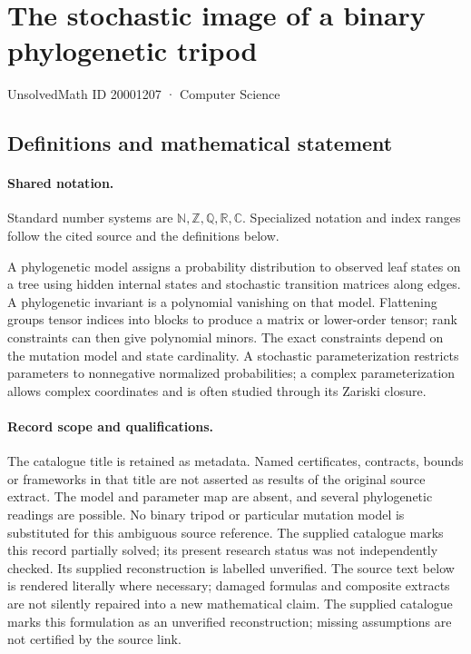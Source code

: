 \documentclass[11pt]{article}
\begin{document}
\setcounter{section}{20001206}
\section{The stochastic image of a binary phylogenetic tripod}\label{20001207}
{\small\sffamily UnsolvedMath ID 20001207 · Computer Science}
\subsection{Definitions and mathematical statement}

\paragraph{Shared notation.}Standard number systems are $\mathbb N,\mathbb Z,\mathbb Q,\mathbb R,\mathbb C$. Specialized notation and index ranges follow the cited source and the definitions below.


A phylogenetic model assigns a probability distribution to observed leaf states on a tree using hidden internal states and stochastic transition matrices along edges. A phylogenetic invariant is a polynomial vanishing on that model. Flattening groups tensor indices into blocks to produce a matrix or lower-order tensor; rank constraints can then give polynomial minors. The exact constraints depend on the mutation model and state cardinality. A stochastic parameterization restricts parameters to nonnegative normalized probabilities; a complex parameterization allows complex coordinates and is often studied through its Zariski closure.
\paragraph{Record scope and qualifications.}
The catalogue title is retained as metadata. Named certificates, contracts, bounds or frameworks in that title are not asserted as results of the original source extract.
The model and parameter map are absent, and several phylogenetic readings are possible. No binary tripod or particular mutation model is substituted for this ambiguous source reference. The supplied catalogue marks this record partially solved; its present research status was not independently checked. Its supplied reconstruction is labelled unverified.
The source text below is rendered literally where necessary; damaged formulas and composite extracts are not silently repaired into a new mathematical claim.
The supplied catalogue marks this formulation as an unverified reconstruction; missing assumptions are not certified by the source link.
\end{document}
